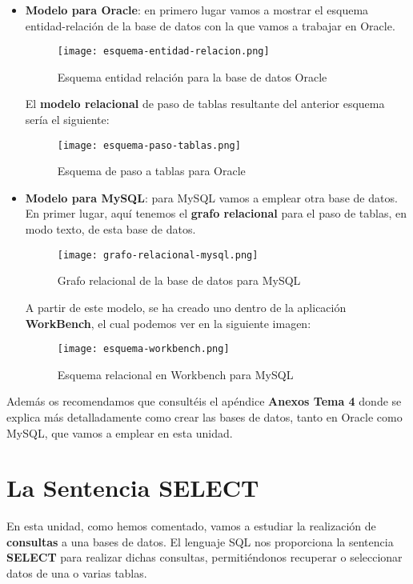 \begin{itemize}
    \item \textbf{Modelo para Oracle}: en primero lugar vamos a mostrar el esquema entidad-relación de la base de datos con la que vamos a trabajar en Oracle.

    \begin{figure}[H]
        \centering
        \texttt{[image: esquema-entidad-relacion.png]}
        \caption{Esquema entidad relación para la base de datos Oracle}
    \end{figure}

    El \textbf{modelo relacional} de paso de tablas resultante del anterior esquema sería el siguiente:

    \begin{figure}[H]
        \centering
        \texttt{[image: esquema-paso-tablas.png]}
        \caption{Esquema de paso a tablas para Oracle}
    \end{figure}

    \item \textbf{Modelo para MySQL}: para MySQL vamos a emplear otra base de datos. En primer lugar, aquí tenemos el \textbf{grafo relacional} para el paso de tablas, en modo texto, de esta base de datos.

    \begin{figure}[H]
        \centering
        \texttt{[image: grafo-relacional-mysql.png]}
        \caption{Grafo relacional de la base de datos para MySQL}
    \end{figure}

    A partir de este modelo, se ha creado uno dentro de la aplicación \textbf{WorkBench}, el cual podemos ver en la siguiente imagen:

    \begin{figure}[H]
        \centering
        \texttt{[image: esquema-workbench.png]}
        \caption{Esquema relacional en Workbench para MySQL}
    \end{figure}
\end{itemize}

Además os recomendamos que consultéis el apéndice \textbf{Anexos Tema 4} donde se explica más detalladamente como crear las bases de datos, tanto en Oracle como MySQL, que vamos a emplear en esta unidad.

\section{La Sentencia SELECT}
En esta unidad, como hemos comentado, vamos a estudiar la realización de \textbf{consultas} a una bases de datos. El lenguaje SQL nos proporciona la sentencia \textbf{SELECT} para realizar dichas consultas, permitiéndonos recuperar o seleccionar datos de una o varias tablas.

